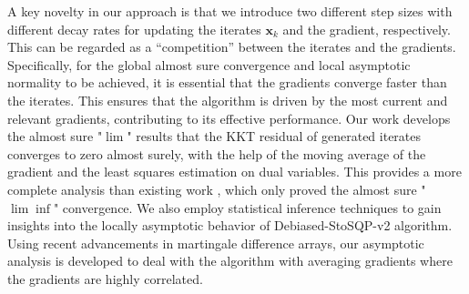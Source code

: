 \documentclass[aos]{imsart}
\numberwithin{equation}{section}
\theoremstyle{plain}
\begin{document}
A key novelty in our approach is that we introduce two different step sizes with different decay rates for updating the iterates $\bm{x}_k$ and the gradient, respectively.
This can be regarded as a ``competition'' between the iterates and the gradients. 
Specifically, for the global almost sure convergence and local asymptotic normality to be achieved, it is essential that the gradients converge faster than the iterates. 
This ensures that the algorithm is driven by the most current and relevant gradients, contributing to its effective performance.
Our work develops the almost sure "$\lim$" results that the KKT residual of generated iterates converges to zero almost surely, with the help of the moving average of the gradient and the least squares estimation on dual variables. 
This provides a more complete analysis than existing work \cite{curtis2023sequential}, which only proved the almost sure "$\lim \inf$" convergence.
We also employ statistical inference techniques to gain insights into the locally asymptotic behavior of Debiased-StoSQP-v2 algorithm. 
Using recent advancements in martingale difference arrays, our asymptotic analysis is developed to deal with the algorithm with averaging gradients where the gradients are highly correlated. 
\end{document}
